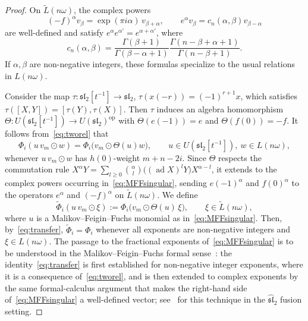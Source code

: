 \documentclass[12pt,a4paper,reqno]{amsart}
\numberwithin{equation}{section}
\theoremstyle{definition}
\renewcommand{\sl}{\mathfrak{sl}}
\def \al{\alpha}
\def \b{\beta}
\def\om{\omega}
\def\ra{\rightarrow}
\def\ad{\operatorname{ad}}
\begin{document}
\begin{proof}
On $\tilde{L}(n\om)$, the complex powers
\[
(-f)^\al v_\b=\exp(\pi i\al)\,v_{\b+\al},\qquad e^\al v_\b=c_n(\al,\b)v_{\b-\al}
\]
are well-defined and satisfy $e^{\al}e^{\al'}=e^{\al+\al'}$, where
\begin{equation}\label{eq:Gammafun}
   c_n(\al,\b)
=
\frac{\Gamma(\beta+1)}
{\Gamma(\beta-\alpha+1)}
\frac{\Gamma(n-\beta+\alpha+1)}
{\Gamma(n-\beta+1)}.
\end{equation}
If $\al,\b$ are non-negative integers, these formulas specialize to the usual relations in $L(n\om)$.


Consider the map $\tau:\sl_2[t^{-1}]\ra \sl_2$, $\tau(x(-r))=(-1)^{r+1}x$, which satisfies $\tau([X,Y])=[\tau(Y),\tau(X)]$. Then $\tau$ induces an algebra homomorphism $\Theta:U(\sl_2[t^{-1}])\ra U(\sl_2)^{\mathrm{op}}$ with $\Theta(e(-1))=e$ and $\Theta(f(0))=-f$. It follows from~\eqref{eq:tworel} that
\begin{equation}\label{eq:transfer}
\Phi_i(u\,v_m\odot w)=\Phi_i\big(v_m\odot \Theta(u)w\big),\qquad u\in U(\sl_2[t^{-1}]),\ w\in L(n\om),
\end{equation}
whenever $u\,v_m\odot w$ has $h(0)$-weight $m+n-2i$. Since $\Theta$ respects the commutation rule $X^\al Y=\sum_{l\geq 0}\binom{\al}{l}\big((\ad X)^lY\big)X^{\al-l}$, it extends to the complex powers occurring in~\eqref{eq:MFFsingular}, sending $e(-1)^\al$ and $f(0)^\al$ to the operators $e^\al$ and $(-f)^\al$ on $\tilde{L}(n\om)$. We define
\[
\tilde\Phi_i(u\,v_m\odot \xi):=\Phi_i\big(v_m\odot \Theta(u)\,\xi\big),\qquad \xi\in \tilde{L}(n\om),
\]
where $u$ is a Malikov--Feigin--Fuchs monomial as in~\eqref{eq:MFFsingular}. Then, by~\eqref{eq:transfer}, $\tilde\Phi_i=\Phi_i$ whenever all exponents are non-negative integers and $\xi\in L(n\om)$. The passage to the fractional exponents of~\eqref{eq:MFFsingular} is to be understood in the Malikov--Feigin--Fuchs formal sense~\cite{malikov1986singular}: the identity~\eqref{eq:transfer} is first established for non-negative integer exponents, where it is a consequence of~\eqref{eq:tworel}, and is then extended to complex exponents by the same formal-calculus argument that makes the right-hand side of~\eqref{eq:MFFsingular} a well-defined vector; see~\cite{feigin1994fusion} for this technique in the $\hat{\sl}_2$ fusion setting.


\end{proof}
\end{document}

